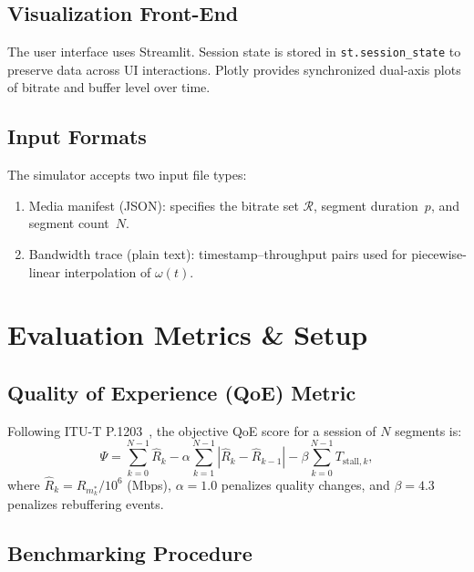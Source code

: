 \documentclass[conference]{IEEEtran}
\begin{document}
\subsection{Visualization Front-End}

The user interface uses Streamlit.  Session state is stored in
\texttt{st.session\_state} to preserve data across UI interactions.
Plotly provides synchronized dual-axis plots of bitrate and buffer
level over time.

\subsection{Input Formats}

The simulator accepts two input file types:
\begin{enumerate}
  \item Media manifest (JSON): specifies the bitrate set $\mathcal{R}$,
    segment duration~$p$, and segment count~$N$.
  \item Bandwidth trace (plain text): timestamp--throughput pairs used
    for piecewise-linear interpolation of $\omega(t)$.
\end{enumerate}

\section{Evaluation Metrics \& Setup}
\label{sec:eval}

\subsection{Quality of Experience (QoE) Metric}

Following ITU-T P.1203~\cite{itup1203}, the objective QoE score for a
session of $N$ segments is:
\begin{equation}
  \Psi=\sum_{k=0}^{N-1}\hat{R}_k
       -\alpha\sum_{k=1}^{N-1}\left|\hat{R}_k-\hat{R}_{k-1}\right|
       -\beta\sum_{k=0}^{N-1}T_{\text{stall},k},
  \label{eq:qoe}
\end{equation}
where $\hat{R}_k=R_{m_k^*}/10^6$ (Mbps), $\alpha=1.0$ penalizes quality
changes, and $\beta=4.3$ penalizes rebuffering events.

\subsection{Benchmarking Procedure}
\end{document}
